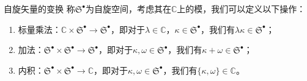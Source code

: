 \begin{defi}[label={transformation of spin vector}]{自旋矢量的变换}
	称$\mathfrak{S}^{\bullet }$为自旋空间，考虑其在$\mathbb{C}$上的模，我们可以定义以下操作：
	\begin{enumerate}[label=(\alph*)]
		\item 标量乘法：$\mathbb{C} \times \mathfrak{S}^{\bullet }\rightarrow \mathfrak{S}^{\bullet }$，即对于$\lambda \in \mathbb{C}$，$\kappa \in \mathfrak{S}^{\bullet }$，我们有$\lambda \kappa \in \mathfrak{S}^{\bullet }$；
		\item 加法：$\mathfrak{S}^{\bullet } \times \mathfrak{S}^{\bullet }\rightarrow \mathfrak{S}^{\bullet }$，即对于$\kappa ,\omega \in \mathfrak{S}^{\bullet }$，我们有$\kappa +\omega \in \mathfrak{S}^{\bullet }$；
		\item 内积：$\mathfrak{S}^{\bullet } \times \mathfrak{S}^{\bullet }\rightarrow \mathbb{C}$，即对于$\kappa ,\omega \in \mathfrak{S}^{\bullet }$，我们有$\{\kappa ,\omega \} \in \mathbb{C}$。
	\end{enumerate}
\end{defi}

